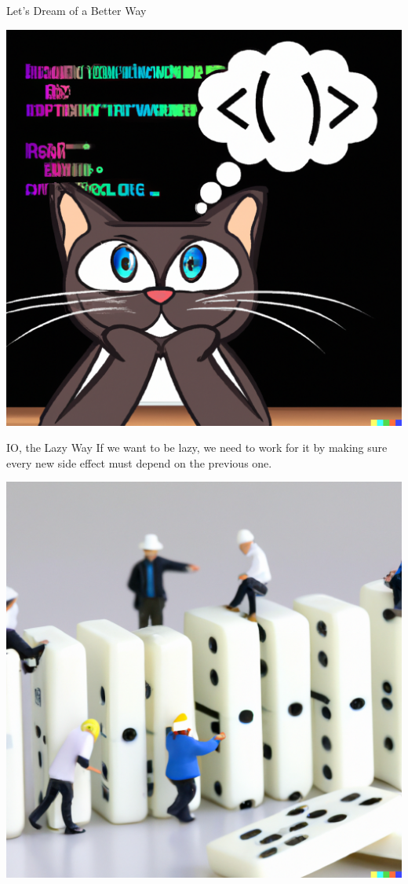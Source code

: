 \documentclass[10pt, presentation, colorlinks]{beamer}
\begin{document}
\begin{frame}[label={sec:orgeab4a82}]{Let's Dream of a Better Way}
\begin{center}
\includegraphics[height=0.6\textheight]{./img/dreaming.png}
\end{center}
\end{frame}

\begin{frame}[label={sec:orga4c0fb6}]{IO, the Lazy Way}
If we want to be lazy, we need to work for it by making sure every new
side effect \alert{must depend on} the previous one.

\begin{center}
\includegraphics[height=0.6\textheight]{./img/dominos.png}
\end{center}
\end{frame}
\end{document}
